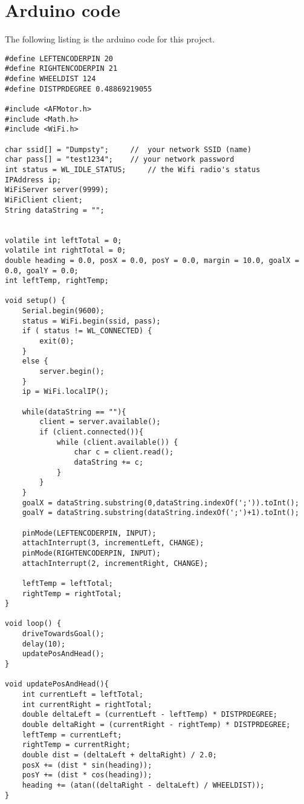 \chapter{Arduino code}
The following listing is the arduino code for this project.

\begin{lstlisting}[caption={Finished arduino code for the project}, label={ArduinoCode}]
#define LEFTENCODERPIN 20
#define RIGHTENCODERPIN 21
#define WHEELDIST 124
#define DISTPRDEGREE 0.48869219055

#include <AFMotor.h>
#include <Math.h>
#include <WiFi.h>

char ssid[] = "Dumpsty";     //  your network SSID (name) 
char pass[] = "test1234";    // your network password
int status = WL_IDLE_STATUS;     // the Wifi radio's status
IPAddress ip;
WiFiServer server(9999);
WiFiClient client;
String dataString = "";


volatile int leftTotal = 0;
volatile int rightTotal = 0;
double heading = 0.0, posX = 0.0, posY = 0.0, margin = 10.0, goalX = 0.0, goalY = 0.0;
int leftTemp, rightTemp;

void setup() {
	Serial.begin(9600);           
	status = WiFi.begin(ssid, pass);
	if ( status != WL_CONNECTED) { 
		exit(0);
	} 
	else {
		server.begin();
	}
	ip = WiFi.localIP();
	
	while(dataString == ""){
		client = server.available();
		if (client.connected()){
			while (client.available()) {
				char c = client.read(); 
				dataString += c;
			}
		}
	}
	goalX = dataString.substring(0,dataString.indexOf(';')).toInt();
	goalY = dataString.substring(dataString.indexOf(';')+1).toInt();  
	
	pinMode(LEFTENCODERPIN, INPUT);
	attachInterrupt(3, incrementLeft, CHANGE);
	pinMode(RIGHTENCODERPIN, INPUT);
	attachInterrupt(2, incrementRight, CHANGE);
	
	leftTemp = leftTotal;
	rightTemp = rightTotal;
}

void loop() {
	driveTowardsGoal();  
	delay(10);
	updatePosAndHead();
}

void updatePosAndHead(){
	int currentLeft = leftTotal;
	int currentRight = rightTotal;
	double deltaLeft = (currentLeft - leftTemp) * DISTPRDEGREE;
	double deltaRight = (currentRight - rightTemp) * DISTPRDEGREE;
	leftTemp = currentLeft;
	rightTemp = currentRight;
	double dist = (deltaLeft + deltaRight) / 2.0;
	posX += (dist * sin(heading));
	posY += (dist * cos(heading));
	heading += (atan((deltaRight - deltaLeft) / WHEELDIST));
}


\end{lstlisting}
